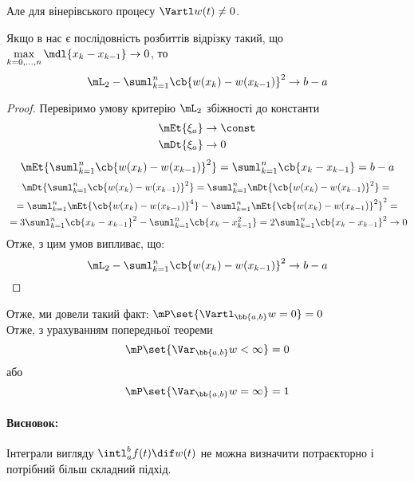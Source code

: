 Але для вінерівського процесу $\Vartl w(t)\neq 0$.
\begin{teor}
Якщо в нас є послідовність розбиттів відрізку  такий, що $\max\limits_{k=0,\ldots,n} \mdl{x_k-x_{k-1}} \to 0$, то
\begin{equation}
\mL_2-\suml_{k=1}^n \cb{w(x_k) - w(x_{k-1})}^2 \to b-a
\end{equation}
\end{teor}
\begin{proof}
Перевіримо умову критерію $\mL_2$ збіжності до константи\\
\begin{eqnarray}
&\mEt{\xi_a} \to\const\\
&\mDt{\xi_a} \to 0
\end{eqnarray}
\begin{equation}
\mEt{\suml_{k=1}^n \cb{w(x_k) - w(x_{k-1})}^2} = \suml_{k=1}^n \cb{x_k - x_{k-1}} = b-a
\end{equation}
\begin{multline}
\mDt{\suml_{k=1}^n \cb{w(x_k) - w(x_{k-1})}^2} = \suml_{k=1}^n \mDt{\cb{w(x_k) - w(x_{k-1})}^2} ={}\\{}= \suml_{k=1}^n \mEt{\cb{w(x_k) - w(x_{k-1})}^4} - \suml_{k=1}^n \mEt{\cb{w(x_k) - w(x_{k-1})}^2}^2 ={}\\{}= 3\suml_{k=1}^n \cb{x_k-x_{k-1}}^2 -\suml_{k=1}^n \cb{x_k-x_{k-1}^2} = 2\suml_{k=1}^n \cb{x_k-x_{k-1}}^2 \to0
\end{multline}
Отже, з цим умов випливає, що:
\begin{equation}
\mL_2-\suml_{k=1}^n \cb{w(x_k) - w(x_{k-1})}^2 \to b-a
\end{equation}
\end{proof}
Отже, ми довели такий факт: $\mP\set{\Vartl_{\bb{a,b}} w = 0} = 0$\\
Отже, з урахуванням попередньої теореми 
\begin{equation}
\mP\set{\Var_{\bb{a,b}} w <\infty} = 0
\end{equation}
або 
\begin{equation}
\mP\set{\Var_{\bb{a,b}} w = \infty} = 1
\end{equation}
\paragraph{Висновок:} Інтеграли вигляду $\intl_a^b f(t)\dif w(t)$ не можна визначити потраєкторно і потрібний більш складний підхід.
